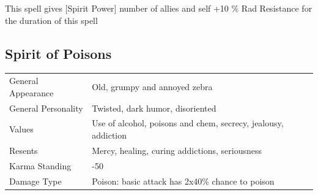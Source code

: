 \documentclass[11pt,a4paper,twocolumn]{book}
\begin{document}
This spell gives [Spirit Power] number of allies and self +10 \% Rad Resistance for the duration of this spell

\bigskip	

\subsection*{Spirit of Poisons}
{
	\begin{tabu} to 75mm{| X[l,4] | X[l,8] |}
		\hline
		General Appearance		& Old, grumpy and annoyed zebra										\\
        General Personality	   	& Twisted, dark humor, disoriented									\\
        Values     				& Use of alcohol, poisons and chem, secrecy, jealousy, addiction	\\
        Resents     			& Mercy, healing, curing addictions, seriousness 					\\
        Karma Standing      	& -50																\\
        Damage Type 			& Poison: basic attack has 2x40\% chance to poison	 				\\ \hline
	\end{tabu}
		
}

\medskip
\end{document}
